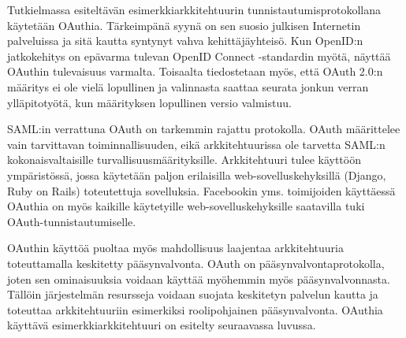 Tutkielmassa esiteltävän esimerkkiarkkitehtuurin tunnistautumisprotokollana käytetään OAuthia. Tärkeimpänä syynä on sen suosio julkisen Internetin palveluissa ja sitä kautta syntynyt vahva kehittäjäyhteisö. Kun OpenID:n jatkokehitys on epävarma tulevan OpenID Connect -standardin myötä, näyttää OAuthin tulevaisuus varmalta. Toisaalta tiedostetaan myös, että OAuth 2.0:n määritys ei ole vielä lopullinen ja valinnasta saattaa seurata jonkun verran ylläpitotyötä, kun määrityksen lopullinen versio valmistuu.

SAML:in verrattuna OAuth on tarkemmin rajattu protokolla. OAuth määrittelee vain tarvittavan toiminnallisuuden, eikä arkkitehtuurissa ole tarvetta SAML:n kokonaisvaltaisille turvallisuusmäärityksille. Arkkitehtuuri tulee käyttöön ympäristössä, jossa käytetään paljon erilaisilla web-sovelluskehyksillä (Django, Ruby on Rails) toteutettuja sovelluksia. Facebookin yms. toimijoiden käyttäessä OAuthia on myös kaikille käytetyille web-sovelluskehyksille saatavilla tuki OAuth-tunnistautumiselle.

OAuthin käyttöä puoltaa myös mahdollisuus laajentaa arkkitehtuuria toteuttamalla keskitetty pääsynvalvonta. OAuth on pääsynvalvontaprotokolla, joten sen ominaisuuksia voidaan käyttää myöhemmin myös pääsynvalvonnasta. Tällöin järjestelmän resursseja voidaan suojata keskitetyn palvelun kautta ja toteuttaa arkkitehtuuriin esimerkiksi roolipohjainen pääsynvalvonta. OAuthia käyttävä esimerkkiarkkitehtuuri on esitelty seuraavassa luvussa.